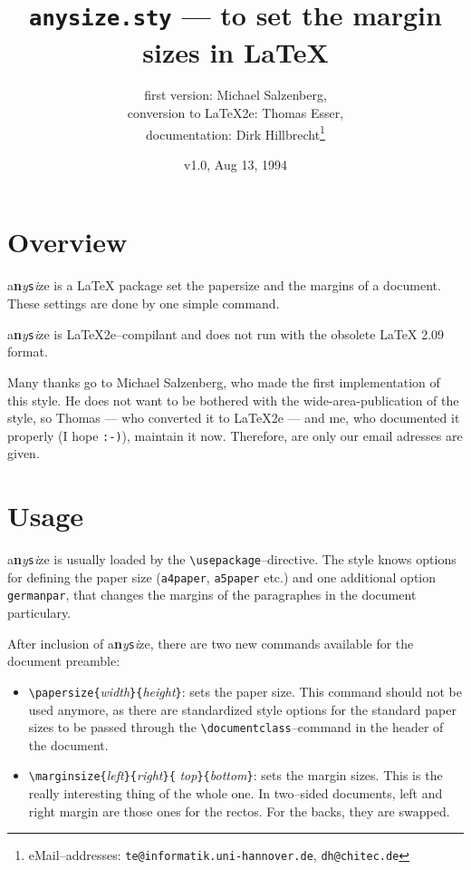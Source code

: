 \documentclass[a4paper]{article}
\newcommand{\anysize}{{\large a}{\small\bf n}{\sl y}{\Large\tt s}{\it i}{\sf\footnotesize z}e}
\begin{document}
\title{{\tt anysize.sty} ---  
to set the margin sizes in  \LaTeX}

\author{
first version: Michael Salzenberg,\\
conversion to \LaTeX2e{}: Thomas Esser,\\
documentation: Dirk Hillbrecht\thanks{eMail--addresses:
{\tt te@informatik.uni-hannover.de}, {\tt dh@chitec.de}}
}
\date{v1.0, Aug 13, 1994}
\maketitle
\thispagestyle{empty}

\section{Overview}

\anysize{} is a \LaTeX{} package set the papersize and the margins of
a document. These settings are done by one simple command.

\anysize{} is \LaTeX2e--compilant and does not run with the
obsolete \LaTeX{} 2.09 format.

Many thanks go to Michael Salzenberg, who made the first implementation of
this style. He does not want to be bothered with the wide-area-publication
of the style, so Thomas --- who converted it to \LaTeX2e{} --- and me,
who documented it properly (I hope {\tt :-)}), maintain it now. Therefore,
are only our email adresses are given.

\section{Usage}

\anysize{} is usually loaded by the \verb|\usepackage|--directive. The
style knows options for defining the paper size ({\tt a4paper}, {\tt a5paper}
etc.) and one additional option {\tt germanpar}, that changes the margins of
the paragraphes in the document particulary.

After inclusion of \anysize{}, there are two new commands available for the document preamble:

\begin{itemize}
\item \verb|\papersize{|{\it width}\verb|}{|{\it height}\verb|}|: sets the paper size. This command
  should not be used anymore, as there are standardized style options for the standard paper sizes
  to be passed through the \verb|\documentclass|--command in the header of the document. 
\item \verb|\marginsize{|{\it left}\verb|}{|{\it right}\verb|}{|{\it 
top}\verb|}{|{\it bottom}\verb|}|:
        sets the margin sizes. This is the really interesting thing of the whole one. In two--sided
        documents, left and right margin are those ones for the rectos. For the backs, they are swapped.
\end{itemize}
\end{document}
